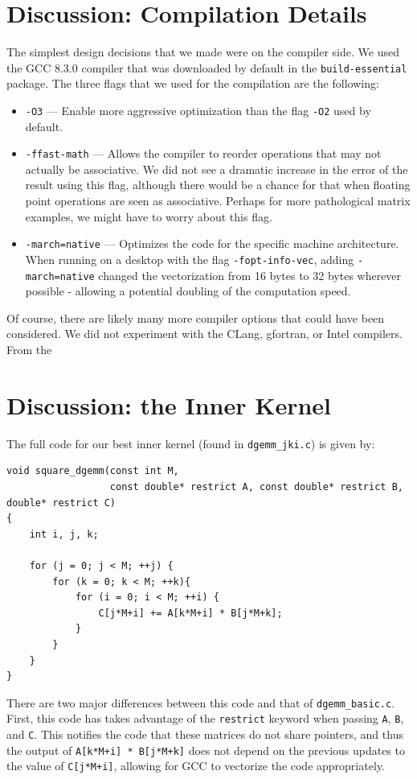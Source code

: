 \documentclass{article}
\begin{document}
\section{Discussion: Compilation Details}
The simplest design decisions that we made were on the compiler side. We used the GCC 8.3.0 compiler that was downloaded by default in the \texttt{build-essential} package. The three flags that we used for the compilation are the following:
\begin{itemize}
	\item \texttt{-O3} --- Enable more aggressive optimization than the flag \texttt{-O2} used by default. 
	\item \texttt{-ffast-math} --- Allows the compiler to reorder operations that may not actually be associative. We did not see a dramatic increase in the error of the result using this flag, although there would be a chance for that when floating point operations are seen as associative. Perhaps for more pathological matrix examples, we might have to worry about this flag.
	\item \texttt{-march=native} --- Optimizes the code for the specific machine architecture. When running on a desktop with the flag \texttt{-fopt-info-vec}, adding \texttt{-march=native} changed the vectorization from 16 bytes to 32 bytes wherever possible - allowing a potential doubling of the computation speed.
\end{itemize}

Of course, there are likely many more compiler options that could have been considered. We did not experiment with the CLang, gfortran, or Intel compilers. From the 


\section{Discussion: the Inner Kernel}
The full code for our best inner kernel (found in \texttt{dgemm\_jki.c}) is given by:
\begin{verbatim}
void square_dgemm(const int M, 
                  const double* restrict A, const double* restrict B, double* restrict C)
{
    int i, j, k;
   
    for (j = 0; j < M; ++j) {			
        for (k = 0; k < M; ++k){
            for (i = 0; i < M; ++i) {
                C[j*M+i] += A[k*M+i] * B[j*M+k];
            }
        }
    }
}
\end{verbatim}

There are two major differences between this code and that of \texttt{dgemm\_basic.c}. First, this code has takes advantage of the \texttt{restrict} keyword when passing \texttt{A}, \texttt{B}, and \texttt{C}. This notifies the code that these matrices do not share pointers, and thus the output of \texttt{A[k*M+i] * B[j*M+k]} does not depend on the previous updates to the value of \texttt{C[j*M+i]}, allowing for GCC to vectorize the code appropriately. 
\end{document}
